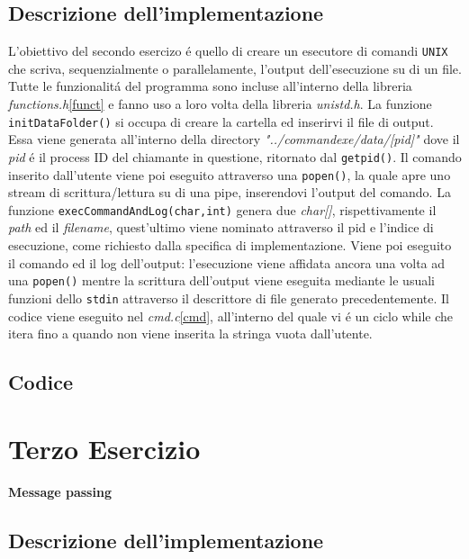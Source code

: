 \documentclass[a4paper]{article}
\begin{document}
\subsection{Descrizione dell'implementazione}
L'obiettivo del secondo esercizo \'e quello di creare un esecutore di comandi \texttt{UNIX} che scriva, sequenzialmente o parallelamente, l'output dell'esecuzione su di un file. \\
Tutte le funzionalit\'a del programma sono incluse all'interno della libreria \textit{functions.h}\ref{funct} e fanno uso a loro volta della libreria \textit{unistd.h}.
La funzione \texttt{initDataFolder()} si occupa di creare la cartella ed inserirvi il file di output. Essa viene generata all'interno della directory \textit{"../commandexe/data/[pid]"} dove il \textit{pid} \'e il process ID del chiamante in questione, ritornato dal \texttt{getpid()}.
Il comando inserito dall'utente viene poi eseguito attraverso una \texttt{popen()}, la quale apre uno stream di scrittura/lettura su di una pipe, inserendovi l'output del comando.
La funzione \texttt{execCommandAndLog(char,int)} genera due \textit{char[]}, rispettivamente il \textit{path} ed il \textit{filename}, quest'ultimo viene nominato attraverso il pid e l'indice di esecuzione, come richiesto dalla specifica di implementazione.
Viene poi eseguito il comando ed il log dell'output: l'esecuzione viene affidata ancora una volta ad una \texttt{popen()} mentre la scrittura dell'output viene eseguita mediante le usuali funzioni dello \texttt{stdin} attraverso il descrittore di file generato precedentemente.
Il codice viene eseguito nel \textit{cmd.c}\ref{cmd}, all'interno del quale vi \'e un ciclo while che itera fino a quando non viene inserita la stringa vuota dall'utente.

\subsection{Codice}



\newpage
\section{Terzo Esercizio}
\textbf{Message passing}
\subsection{Descrizione dell'implementazione}
\end{document}
